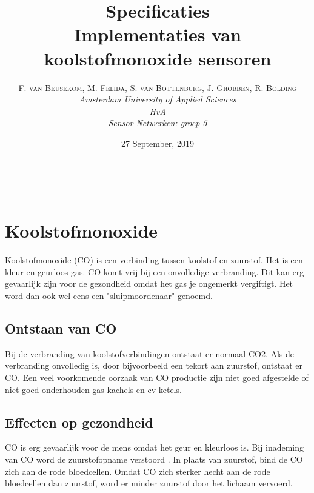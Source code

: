 \documentclass[a4paper, 11pt]{article} %
\title{\textbf{Specificaties}\\ %
Implementaties van koolstofmonoxide sensoren} %
\author{\textsc{F. van Beusekom, M. Felida, S. van Bottenburg, J. Grobben, R. Bolding} %
\\{\textit{Amsterdam University of Applied Sciences\\ 
HvA\\
Sensor Netwerken: groep 5}}} %
\date{27 September, 2019} %
\makeatletter
\renewcommand{\maketitle}{ %
\begin{flushright} %
{\LARGE\@title} %

\vspace{50pt} %

{\large\@author} %
\\\@date %

\vspace{40pt} %
\end{flushright}
}
\makeatother
\begin{document}
\captionsetup{justification=centering}
\hypersetup{hidelinks=true}
\maketitle %




\vspace{10pt} %

\newpage
\section{Koolstofmonoxide}
Koolstofmonoxide (CO) is een verbinding tussen koolstof en zuurstof. Het is een kleur en geurloos gas. CO komt vrij bij een onvolledige verbranding. Dit kan erg gevaarlijk zijn voor de gezondheid omdat het gas je ongemerkt vergiftigt. Het word dan ook wel eens een "sluipmoordenaar" genoemd. 

\subsection{Ontstaan van CO}
Bij de verbranding van koolstofverbindingen ontstaat er normaal CO2. Als de verbranding onvolledig is, door bijvoorbeeld een tekort aan zuurstof, ontstaat er CO. Een veel voorkomende oorzaak van CO productie zijn niet goed afgestelde of niet goed onderhouden gas kachels en cv-ketels.

\subsection{Effecten op gezondheid}
CO is erg gevaarlijk voor de mens omdat het geur en kleurloos is. Bij inademing van CO word de zuurstofopname verstoord \cite{Effecten Koolmonoxide} . In plaats van zuurstof, bind de CO zich aan de rode bloedcellen. Omdat CO zich sterker hecht aan de rode bloedcellen dan zuurstof, word er minder zuurstof door het lichaam vervoerd. 
\end{document}
